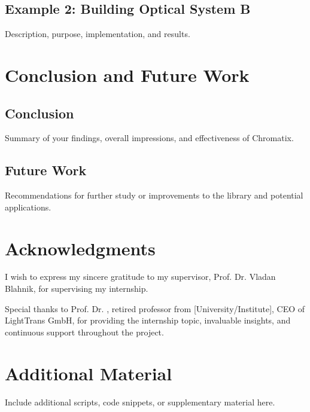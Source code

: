 \documentclass[a4paper,12pt]{report}
\begin{document}
\section{Example 2: Building Optical System B}
Description, purpose, implementation, and results.

\chapter{Conclusion and Future Work}
\section{Conclusion}
Summary of your findings, overall impressions, and effectiveness of Chromatix.

\section{Future Work}
Recommendations for further study or improvements to the library and potential applications.

\chapter{Acknowledgments}
I wish to express my sincere gratitude to my supervisor, Prof. Dr. Vladan Blahnik, for supervising my internship. 

Special thanks to Prof. Dr. , retired professor from [University/Institute], CEO of LightTrans GmbH, for providing the internship topic, invaluable insights, and continuous support throughout the project. 






\appendix
\chapter{Additional Material}
Include additional scripts, code snippets, or supplementary material here.
\end{document}
